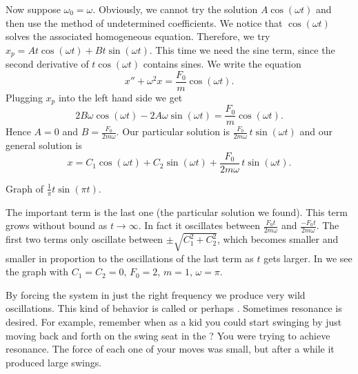 \documentclass[12pt]{book}
\begin{document}
Now suppose $\omega_0 = \omega$.  Obviously, we cannot try
the solution $A \cos (\omega t)$ and then use the method of undetermined
coefficients.  We notice that $\cos (\omega t)$ solves the associated
homogeneous equation.  Therefore,
we 
try $x_p = A t \cos (\omega t) + B t \sin (\omega t)$.  This time we need
the sine
term, since the second derivative of $t \cos (\omega t)$ contains sines.
We write the equation
\begin{equation*}
x'' + \omega^2 x = \frac{F_0}{m} \cos ( \omega t) .
\end{equation*}
Plugging $x_p$ into the left hand side we get
\begin{equation*}
2 B \omega \cos (\omega t) - 2 A \omega \sin (\omega t) = 
\frac{F_0}{m} \cos (\omega t) .
\end{equation*}
Hence $A = 0$ and $B = \frac{F_0}{2m\omega}$.  Our particular solution is
$\frac{F_0}{2m\omega} \, t \sin (\omega t)$ and our general solution is
\begin{equation*}
x = C_1 \cos (\omega t) + C_2 \sin (\omega t)
+ \frac{F_0}{2m\omega} \, t \sin (\omega t) .
\end{equation*}


\begin{diffyfloatingfigurepdfonly}{3.1in}
\capstart
\begin{center}
\caption{Graph of
$\frac{1}{\pi} t \sin (\pi t)$.\label{3.6:resonancefig}}
\end{center}
\end{diffyfloatingfigurepdfonly}

The important term is the last one (the particular solution we found).  
This term grows without bound as $t \to \infty$.  In fact it
oscillates 
between $\frac{F_0 t}{2m\omega}$ and
$\frac{- F_0 t}{2m\omega}$.  The first two terms only oscillate between
$\pm\sqrt{C_1^2 + C_2^2}$, which becomes smaller and smaller in proportion to
the oscillations of the last term as $t$ gets larger.  In
 we see the graph with $C_1=C_2=0$, $F_0 = 2$,
$m=1$, $\omega = \pi$.

By forcing the system in just the right frequency we produce very wild
oscillations.  This kind of behavior is called \emph{} or
perhaps
\emph{}.  Sometimes resonance is
desired.  For
example, remember when as a kid you could start swinging by just moving back
and forth on the swing seat in the ?  You were trying to
achieve resonance.  The force of each one of your moves was small, but after a
while it produced large swings.
\end{document}

